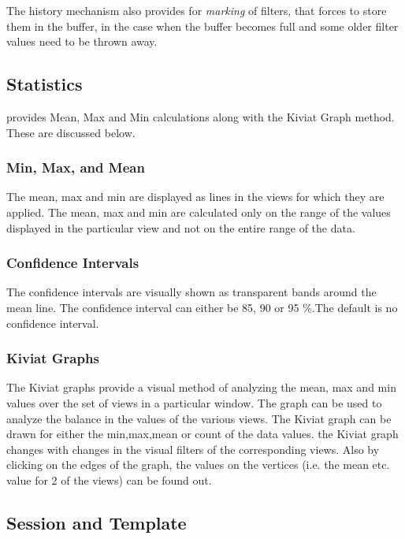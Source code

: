 The history mechanism also provides for {\em marking} of filters,
that forces \Devise to store them in the buffer, in the case when the
buffer becomes full and some older filter values need to be thrown
away.

\subsection{Statistics}

\Devise provides Mean, Max and Min calculations along with the Kiviat
Graph method. These are discussed below.

\subsubsection{Min, Max, and Mean}

The mean, max and min are displayed as lines in the views for which
they are applied. The mean, max and min are calculated only on the
range of the values displayed in the particular view and not on the
entire range of the data.

\subsubsection{Confidence Intervals}

The confidence intervals are visually shown as transparent bands
around the mean line. The confidence interval can either be 85, 90 or
95 \%.The default is no confidence interval.

\subsubsection{Kiviat Graphs}

The Kiviat graphs provide a visual method of analyzing the mean, max
and min values over the set of views in a particular window. The graph
can be used to analyze the balance in the values of the various
views. The Kiviat graph can be drawn for either the min,max,mean or
count of the data values. the Kiviat graph changes with changes in the
visual filters of the corresponding views. Also by clicking on the
edges of the graph, the values on the vertices (i.e. the mean
etc. value for 2 of the views) can be found out.

\subsection{Session and Template}

